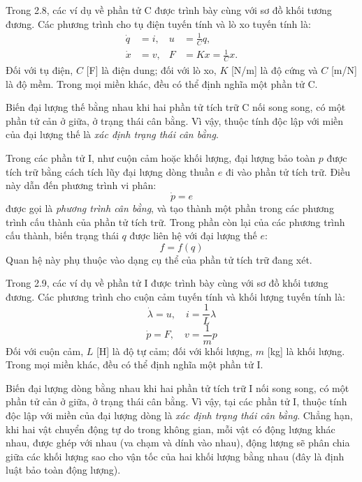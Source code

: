 Trong 2.8, các ví dụ về phần tử C được trình bày cùng với sơ đồ khối tương đương. Các phương trình cho tụ điện tuyến tính và lò xo tuyến tính là:
\[
\begin{aligned}
\dot q&=i, & u&=\frac{1}{C}q,\\
\dot x&=v, & F&=Kx=\frac{1}{C}x.
\end{aligned}
\]
Đối với tụ điện, $C$ [F] là điện dung; đối với lò xo, $K$ [N/m] là độ cứng và $C$ [m/N] là độ mềm. Trong mọi miền khác, đều có thể định nghĩa một phần tử C.

Biến đại lượng thế bằng nhau khi hai phần tử tích trữ C nối song song, có một phần tử cản ở giữa, ở trạng thái cân bằng. Vì vậy, thuộc tính độc lập với miền của đại lượng thế là \emph{xác định trạng thái cân bằng}.

Trong các phần tử I, như cuộn cảm hoặc khối lượng, đại lượng bảo toàn $p$ được tích trữ bằng cách tích lũy đại lượng dòng thuần $e$ đi vào phần tử tích trữ. Điều này dẫn đến phương trình vi phân:
\[\dot p=e\]
được gọi là \emph{phương trình cân bằng}, và tạo thành một phần trong các phương trình cấu thành của phần tử tích trữ. Trong phần còn lại của các phương trình cấu thành, biến trạng thái $q$ được liên hệ với đại lượng thế $e$:
\[f=f(q)\]
Quan hệ này phụ thuộc vào dạng cụ thể của phần tử tích trữ đang xét.

Trong 2.9, các ví dụ về phần tử I được trình bày cùng với sơ đồ khối tương đương. Các phương trình cho cuộn cảm tuyến tính và khối lượng tuyến tính là:
\begin{equation}\dot\lambda=u,\quad i=\frac{1}{L}\lambda\tag{2.1}\end{equation}
\begin{equation}\dot p=F,\quad v=\frac{1}{m}p\tag{2.2}\end{equation}
Đối với cuộn cảm, $L$ [H] là độ tự cảm; đối với khối lượng, $m$ [kg] là khối lượng. Trong mọi miền khác, đều có thể định nghĩa một phần tử I.

Biến đại lượng dòng bằng nhau khi hai phần tử tích trữ I nối song song, có một phần tử cản ở giữa, ở trạng thái cân bằng. Vì vậy, tại các phần tử I, thuộc tính độc lập với miền của đại lượng dòng là \emph{xác định trạng thái cân bằng}. Chẳng hạn, khi hai vật chuyển động tự do trong không gian, mỗi vật có động lượng khác nhau, được ghép với nhau (va chạm và dính vào nhau), động lượng sẽ phân chia giữa các khối lượng sao cho vận tốc của hai khối lượng bằng nhau (đây là định luật bảo toàn động lượng).


